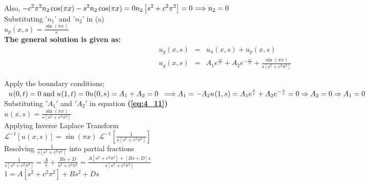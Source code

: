 \documentclass[12pt]{report}
\newcommand{\Laplace}{\mathcal{L}}
\newcommand{\sbracket}[1]{\left[#1\right]}
\newcommand{\Un}[2]{u_{#1}(#2)}
\newcommand{\NI}{\noindent}
\newcommand{\psq}{\pi^{2}}
\newcommand{\InverseL}[1]{\Laplace^{-1}\left[#1\right]}
\newcommand{\bt}[1]{\textbf{#1}}
\newcommand{\refn}[1]{\bt{(\ref{#1})}}
\begin{document}
\NI Also, 
$
\displaystyle -c^{2}\psq n_{2}\cos(\pi x) - s^{2}n_{2}\cos(\pi x) = 0 \\[0.2cm]
n_2\left[s^{2} + c^{2}\psq \right] = 0 \\[0.2cm] 
\Longrightarrow n_{2} = 0 \\
$\\[0.2cm]

\NI Substituting '$n_{1}$' and '$n_{2}$' in (a)\\[0.2cm]
$ \displaystyle
\Un{p}{x,s} = \frac{\sin(\pi x)}{s}
$\\[0.2cm]

\NI \textbf{The general solution is given as:}\\[0.2cm]
\begin{eqnarray}
	\Un{g}{x,s} &=& \Un{u}{x,s} + \Un{p}{x,s} \nonumber\\[0.2cm]
	\Un{g}{x,s} &=& A_{1}e^{\frac{sx}{c}} + A_{2}e^{-\frac{sx}{c}} + \frac{\sin(\pi x)}{s\left[ s^{2} + c^{2}\psq \right]}  \label{eq:4_11}	
\end{eqnarray}

\NI Apply the boundary conditions;
$\displaystyle
\; \; \Un{}{0,t} = 0 \; \text{and} \; \Un{}{1,t} = 0 \\[0.2cm]
\Un{}{0,s} = A_1 + A_2 = 0 \; \; \Longrightarrow A_1 = - A_2 \\[0.1cm]
\Un{}{1,s} = A_1 e^{\frac{s}{c}} + A_2 e^{- \frac{s}{c}} = 0 \Rightarrow A_2 = 0 \Rightarrow A_1 = 0
$\\[0.3cm]

\NI Substituting $'A_1'$ and $'A_2'$ in equation \refn{eq:4_11} \\[0.2cm]
$\displaystyle
\Un{}{x,s} = \frac{\sin(\pi x)}{s \left[s^{2} + c^{2}\psq \right]}
$\\[1cm]

\NI Applying Inverse Laplace Transform \\[0.2cm]
$\displaystyle
\InverseL{\Un{}{x,s}} = \sin(\pi x) \; \InverseL{\frac{1}{s\sbracket{s^{2} + c^{2}\psq}}}
$\\[0.3cm]

\NI Resolving $\displaystyle \frac{1}{s\sbracket{s^{2} + c^{2}\psq}}$ into partial fractions \\[0.2cm]
$\displaystyle
\frac{1}{s\sbracket{s^{2} + c^{2}\psq}} = \frac{A}{s} + \frac{Bs + D}{s^{2} + c^{2}\psq} = \frac{A\sbracket{s^2 + c^2 \psq} + \sbracket{Bs + D}s}{s\sbracket{s^2 + c^2 \psq}}
$\\[0.3cm]
$\displaystyle
1 = A \sbracket{s^2 + c^2 \psq} + Bs^2 + Ds
$\\[0.3cm]
\end{document}
